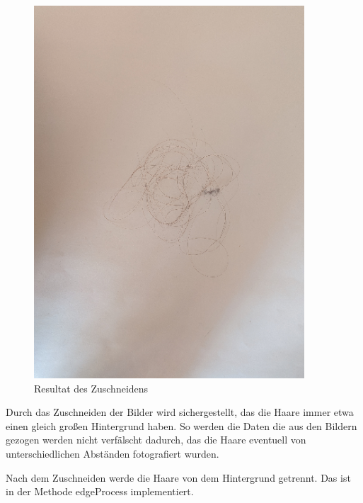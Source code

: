 \documentclass[german,a4paper,12pt]{llncs}
\begin{document}
\begin{figure}
	\centering
	\includegraphics[width=0.9\textwidth]{fig64/03crop image.png}
	\caption[]{Resultat des Zuschneidens}
	\label{img:Crop}
\end{figure}

Durch das Zuschneiden der Bilder wird sichergestellt, das die Haare immer etwa einen gleich großen Hintergrund haben. So werden die Daten die aus den Bildern gezogen werden nicht verfälscht dadurch, das die Haare eventuell von unterschiedlichen Abständen fotografiert wurden. 

Nach dem Zuschneiden werde die Haare von dem Hintergrund getrennt.
Das ist in der Methode edgeProcess implementiert.
\end{document}
